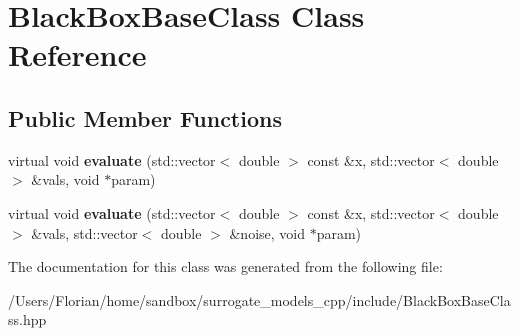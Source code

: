 \hypertarget{class_black_box_base_class}{}\section{Black\+Box\+Base\+Class Class Reference}
\label{class_black_box_base_class}
\subsection*{Public Member Functions}
\begin{DoxyCompactItemize}
\item 
virtual void {\bfseries evaluate} (std\+::vector$<$ double $>$ const \&x, std\+::vector$<$ double $>$ \&vals, void $\ast$param)\hypertarget{class_black_box_base_class_a7a9b4c8e0545f7eb59158b51164bfaf2}{}\label{class_black_box_base_class_a7a9b4c8e0545f7eb59158b51164bfaf2}

\item 
virtual void {\bfseries evaluate} (std\+::vector$<$ double $>$ const \&x, std\+::vector$<$ double $>$ \&vals, std\+::vector$<$ double $>$ \&noise, void $\ast$param)\hypertarget{class_black_box_base_class_a8b1d53b95f58ea751c15197da2a385a4}{}\label{class_black_box_base_class_a8b1d53b95f58ea751c15197da2a385a4}

\end{DoxyCompactItemize}


The documentation for this class was generated from the following file\+:\begin{DoxyCompactItemize}
\item 
/\+Users/\+Florian/home/sandbox/surrogate\+\_\+models\+\_\+cpp/include/Black\+Box\+Base\+Class.\+hpp\end{DoxyCompactItemize}
